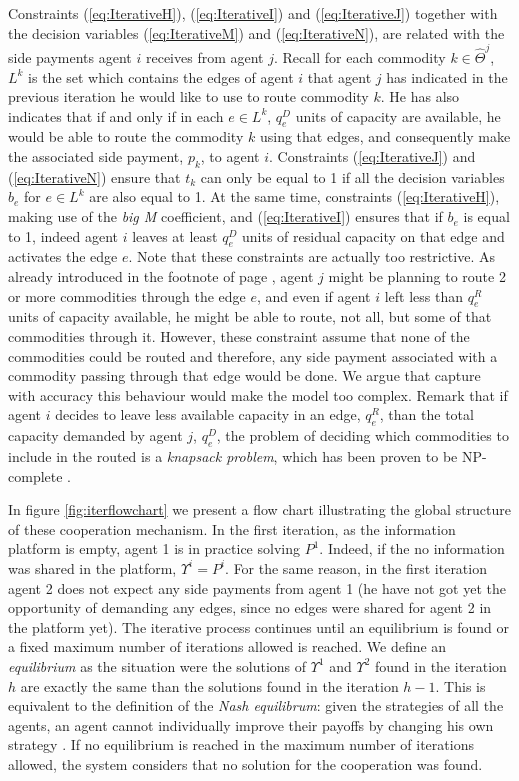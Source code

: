 \documentclass{article}
\begin{document}
Constraints (\ref{eq:IterativeH}),  (\ref{eq:IterativeI}) and (\ref{eq:IterativeJ}) together with the decision variables (\ref{eq:IterativeM}) and (\ref{eq:IterativeN}), are related with the side payments agent $i$ receives from agent $j$. Recall for each commodity $k\in \widehat{\Theta}^j$, $L^k$ is the set which contains the edges of agent $i$ that agent $j$ has indicated in the previous iteration he would like to use to route commodity $k$. He has also indicates that if and only if in each $e \in L^k$, $q_e^D$ units of capacity are available, he would be able to route the commodity $k$ using that edges, and consequently make the associated side payment, $p_k$, to agent $i$. Constraints (\ref{eq:IterativeJ}) and (\ref{eq:IterativeN}) ensure that $t_k$ can only be equal to 1 if all the decision variables $b_e$ for $e \in L^k$ are also equal to 1. At the same time, constraints (\ref{eq:IterativeH}),  making use of the \emph{big M} coefficient, and (\ref{eq:IterativeI}) ensures that if $b_e$ is equal to 1, indeed agent $i$ leaves at least $q_e^D$ units of residual capacity on that edge and activates the edge $e$. Note that these constraints are actually too restrictive. As already introduced in the footnote of page \pageref{ft:sidepaymentexplanation}, agent $j$ might be planning to route 2 or more commodities through the edge $e$, and even if agent $i$ left less than $q_e^R$ units of capacity available, he might be able to route, not all, but some of that commodities through it. However, these constraint assume that none of the commodities could be routed and therefore, any side payment associated with a commodity passing through that edge would be done. We argue that capture with accuracy this behaviour would make the model too complex. Remark that if agent $i$ decides to leave less available capacity in an edge, $q_e^R$, than the total capacity demanded by agent $j$, $q_e^D$, the problem of deciding which commodities to include in the routed is a \emph{knapsack problem}, which has been proven to be NP-complete \parencite{KARP1972}.

In figure \ref{fig:iterflowchart} we present a flow chart illustrating the global structure of these cooperation mechanism.
In the first iteration, as the information platform is empty, agent 1 is in practice solving $P^1$. Indeed, if the no information was shared in the platform, $\Upsilon^i=P^i$. For the same reason, in the first iteration agent 2 does not expect any side payments from agent 1 (he have not got yet the opportunity of demanding any edges, since no edges were shared for agent 2 in the platform yet). The iterative process continues until an equilibrium is found or a fixed maximum number of iterations allowed is reached. We define an \emph{equilibrium} as the situation were the solutions of $\Upsilon^1$ and $\Upsilon^2$ found in the iteration $h$ are exactly the same than the solutions found in the iteration $h-1$. This is equivalent to the definition of the \emph{Nash equilibrum}: given the strategies of all the agents, an agent cannot individually improve their payoffs by changing his own strategy \parencite{GONZALEZ2010}. If no equilibrium is reached in the maximum number of iterations allowed, the system considers that no solution for the cooperation was found.
\end{document}

